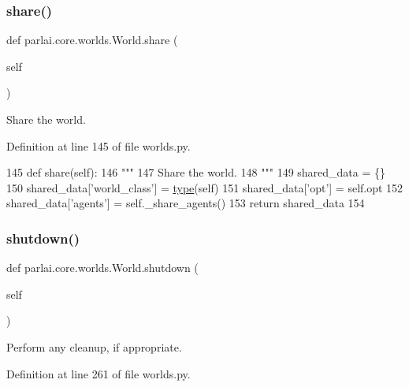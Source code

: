\subsubsection{\texorpdfstring{share()}{share()}}
{\footnotesize\ttfamily def parlai.\+core.\+worlds.\+World.\+share (\begin{DoxyParamCaption}\item[{}]{self }\end{DoxyParamCaption})}

\begin{DoxyVerb}Share the world.
\end{DoxyVerb}
 

Definition at line 145 of file worlds.\+py.


\begin{DoxyCode}
145     \textcolor{keyword}{def }share(self):
146         \textcolor{stringliteral}{"""}
147 \textcolor{stringliteral}{        Share the world.}
148 \textcolor{stringliteral}{        """}
149         shared\_data = \{\}
150         shared\_data[\textcolor{stringliteral}{'world\_class'}] = \hyperlink{namespaceparlai_1_1agents_1_1tfidf__retriever_1_1build__tfidf_ad5dfae268e23f506da084a9efb72f619}{type}(self)
151         shared\_data[\textcolor{stringliteral}{'opt'}] = self.opt
152         shared\_data[\textcolor{stringliteral}{'agents'}] = self.\_share\_agents()
153         \textcolor{keywordflow}{return} shared\_data
154 
\end{DoxyCode}
\mbox{\label{classparlai_1_1core_1_1worlds_1_1World_a7e7e5a27569323dd334b87df6fef31e6}} 
\subsubsection{\texorpdfstring{shutdown()}{shutdown()}}
{\footnotesize\ttfamily def parlai.\+core.\+worlds.\+World.\+shutdown (\begin{DoxyParamCaption}\item[{}]{self }\end{DoxyParamCaption})}

\begin{DoxyVerb}Perform any cleanup, if appropriate.
\end{DoxyVerb}
 

Definition at line 261 of file worlds.\+py.


